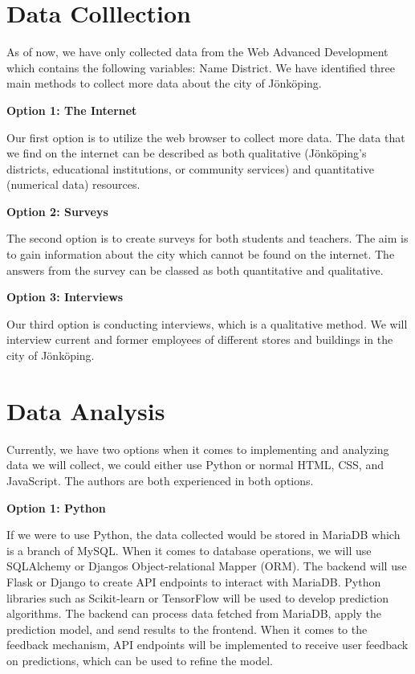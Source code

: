 \section{Data Colllection} \label{sec:DataCollection}

As of now, we have only collected data from the Web Advanced Development which contains the following variables: Name District. We have identified three main methods to collect more data about the city of Jönköping.

\textbf{Option 1: The Internet }


Our first option is to utilize the web browser to collect more data. The data that we find on the internet can be described as both qualitative (Jönköping's districts, educational institutions, or community services) and quantitative (numerical data) resources.


\textbf{Option 2: Surveys}


The second option is to create surveys for both students and teachers. The aim is to gain information about the city which cannot be found on the internet. The answers from the survey can be classed as both quantitative and qualitative. 

\textbf{Option 3: Interviews}


Our third option is conducting interviews, which is a qualitative method. We will interview current and former employees of different stores and buildings in the city of Jönköping.
 

\section{Data Analysis}
Currently, we have two options when it comes to implementing and analyzing data we will collect, we could either use Python or normal HTML, CSS, and JavaScript. The authors are both experienced in both options. 

\textbf{Option 1: Python}


If we were to use Python, the data collected would be stored in MariaDB which is a branch of MySQL. When it comes to database operations, we will use SQLAlchemy or Djangos Object-relational Mapper (ORM). The backend will use Flask or Django to create API endpoints to interact with MariaDB.
Python libraries such as Scikit-learn or TensorFlow will be used to develop prediction algorithms. The backend can process data fetched from MariaDB, apply the prediction model, and send results to the frontend.
When it comes to the feedback mechanism, API endpoints will be implemented to receive user feedback on predictions, which can be used to refine the model.


